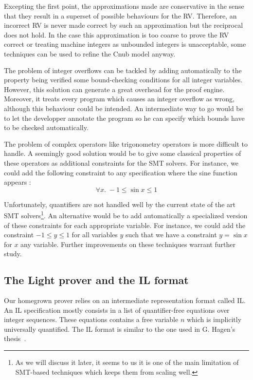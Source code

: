 Excepting the first point, the approximations made are conservative  in the sense that they result in a superset of possible behaviours for the RV. Therefore, an incorrect RV is never made correct by such an approximation but the reciprocal does not hold. In the case this approximation is too coarse to prove the RV correct or treating machine integers as unbounded integers is unacceptable, some techniques can be used to refine the Cnub model anyway. 

\medskip

The problem of integer overflows can be tackled by adding automatically to the property being verified some bound-checking conditions for all integer variables. However, this solution can generate a great overhead for the proof engine. Moreover, it treats every program which causes an integer overflow as wrong, although this behaviour could be intended. An intermediate way to go would be to let the developper annotate the program so he can specify which bounds have to be checked automatically.

\medskip

The problem of complex operators like trigonometry operators is more difficult to handle. A seemingly good solution would be to give some classical properties of these operators as additional constraints for the SMT solvers. For instance, we could add the following constraint to any specification where the sine function appears : \[ \forall x . \; -1 \leq \sin x \leq 1 \]

Unfortunately, quantifiers are not handled well by the current state
of the art SMT solvers\footnote{As we will discuss it later, it
  seems to us it is one of the main limitation of SMT-based techniques
  which keeps them from scaling well.}. An alternative would be to add
automatically a specialized version of these constraints for each
appropriate variable. For instance, we could add the constraint $-1
\leq y \leq 1 $ for all variables $y$ such that we have a
constraint $ y = \sin x $ for $x$ any variable.  Further
improvements on these techniques warrant further study.





\subsection{The Light prover and the IL format} 

Our homegrown prover relies on an intermediate representation format called {IL}. An IL specification mostly consists in a list of quantifier-free equations over integer sequences. These equations contains a free variable $n$ which is implicitly universally quantified. The IL format is similar to the one used in G. Hagen's thesis~\cite{HagenPhD}.


